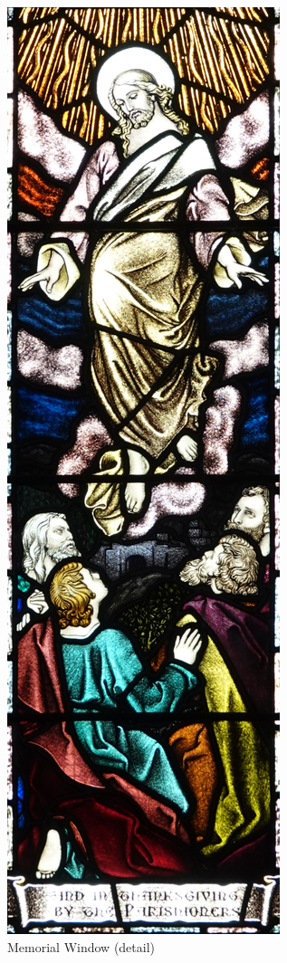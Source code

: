 \begin{figure}
\begin{center}
\includegraphics[width=.85\linewidth,center]{../images/memorialWindow.jpg}
\caption{Memorial Window (detail)}
\end{center}
\end{figure}




